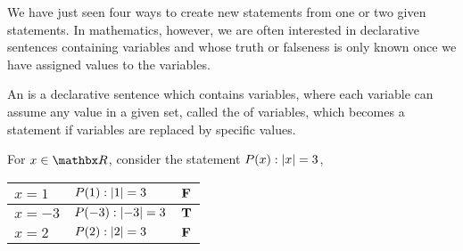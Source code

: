 \vspace*{1.5em}

We have just seen four ways to create new statements from one or two given statements. In mathematics, however, we are often interested in declarative sentences containing variables and whose truth or falseness is only known once we have assigned values to the variables.
\begin{definition}
An  is a declarative sentence which contains variables, where each variable can assume any value in a given set, called the  of variables, which becomes a statement if variables are replaced by specific values. 
\end{definition}

\vspace*{1em}

\begin{example}
For $x \in \rr$, consider the statement $P(x):\left\lvert x\right\rvert = 3$,
\begin{center}
{\renewcommand{\arraystretch}{1.5}%
\begin{tabular}{|>{\centering}m{1.5cm}|>{\centering}m{3cm}|>{\centering\arraybackslash}m{1cm}|}
\hline
$x = 1$ & $P(1) : \left\lvert1\right\rvert = 3$ & $\mathbf{F}$\\
\hline
$x = -3$ & $P(-3) : \left\lvert-3\right\rvert = 3$ & $\mathbf{T}$\\
\hline
$x = 2$ & $P(2) : \left\lvert2\right\rvert = 3$ & $\mathbf{F}$\\
\hline
\end{tabular}
}
\end{center}
\end{example}

\vspace*{1em}

